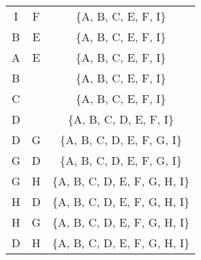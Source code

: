 \begin{naloga}
\begin{odgovor}
\begin{tabela}
\begin{tabular}{c|c|c}
I & F & \{A, B, C, E, F, I\} \\
B & E & \{A, B, C, E, F, I\} \\
A & E & \{A, B, C, E, F, I\} \\
B & & \{A, B, C, E, F, I\} \\
C & & \{A, B, C, E, F, I\} \\
D & & \{A, B, C, D, E, F, I\} \\
D & G &\{A, B, C, D, E, F, G, I\} \\
G & D & \{A, B, C, D, E, F, G, I\} \\
G & H & \{A, B, C, D, E, F, G, H, I\} \\
H & D & \{A, B, C, D, E, F, G, H, I\} \\
H & G & \{A, B, C, D, E, F, G, H, I\} \\
D & H & \{A, B, C, D, E, F, G, H, I\} \\
\end{tabular}
\end{tabela}

\begin{slika}
\pgfslika
{}
\end{slika}

\end{odgovor}
\end{naloga}
